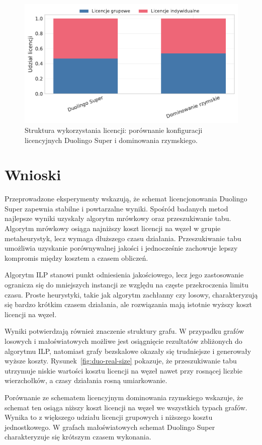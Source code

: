 \begin{figure}[H]
  \centering
  \includegraphics[width=0.6\linewidth]{assets/figures/benchmark/synthetic/license_mix_duo_vs_roman.pdf}
  \caption{Struktura wykorzystania licencji: porównanie konfiguracji licencyjnych Duolingo Super i dominowania rzymskiego.}
  \label{fig:duo-roman-license}
\end{figure}

\section{Wnioski}

Przeprowadzone eksperymenty wskazują, że schemat licencjonowania Duolingo Super zapewnia stabilne i powtarzalne wyniki. Spośród badanych metod najlepsze wyniki uzyskały algorytm mrówkowy oraz przeszukiwanie tabu. Algorytm mrówkowy osiąga najniższy koszt licencji na węzeł w grupie metaheurystyk, lecz wymaga dłuższego czasu działania. Przeszukiwanie tabu umożliwia uzyskanie porównywalnej jakości i jednocześnie zachowuje lepszy kompromis między kosztem a czasem obliczeń.

Algorytm ILP stanowi punkt odniesienia jakościowego, lecz jego zastosowanie ogranicza się do mniejszych instancji ze względu na częste przekroczenia limitu czasu. Proste heurystyki, takie jak algorytm zachłanny czy losowy, charakteryzują się bardzo krótkim czasem działania, ale rozwiązania mają istotnie wyższy koszt licencji na węzeł.

Wyniki potwierdzają również znaczenie struktury grafu. W przypadku grafów losowych i małoświatowych możliwe jest osiągnięcie rezultatów zbliżonych do algorytmu ILP, natomiast grafy bezskalowe okazały się trudniejsze i generowały wyższe koszty. Rysunek~\ref{fig:duo-real-size} pokazuje, że przeszukiwanie tabu utrzymuje niskie wartości kosztu licencji na węzeł nawet przy rosnącej liczbie wierzchołków, a czasy działania rosną umiarkowanie.

Porównanie ze schematem licencyjnym dominowania rzymskiego wskazuje, że schemat ten osiąga niższy koszt licencji na węzeł we wszystkich typach grafów. Wynika to z większego udziału licencji grupowych i niższego kosztu jednostkowego. W grafach małoświatowych schemat Duolingo Super charakteryzuje się krótszym czasem wykonania.

